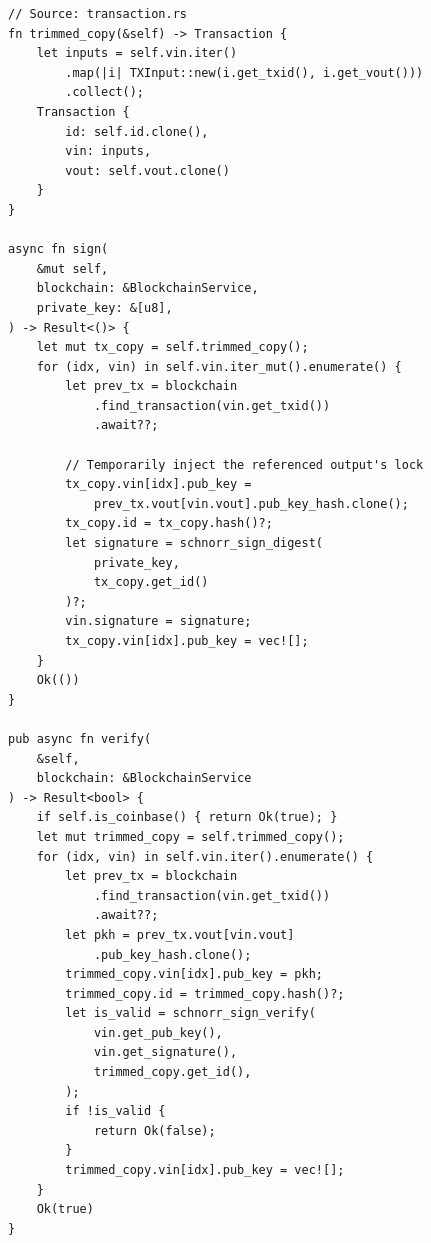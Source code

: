 \begin{listing}[htbp]
\caption{Trimmed copy, signing, and verification}
\label{lst:ch09-5-4}
\begin{verbatim}
// Source: transaction.rs
fn trimmed_copy(&self) -> Transaction {
    let inputs = self.vin.iter()
        .map(|i| TXInput::new(i.get_txid(), i.get_vout()))
        .collect();
    Transaction {
        id: self.id.clone(),
        vin: inputs,
        vout: self.vout.clone()
    }
}

async fn sign(
    &mut self,
    blockchain: &BlockchainService,
    private_key: &[u8],
) -> Result<()> {
    let mut tx_copy = self.trimmed_copy();
    for (idx, vin) in self.vin.iter_mut().enumerate() {
        let prev_tx = blockchain
            .find_transaction(vin.get_txid())
            .await??;

        // Temporarily inject the referenced output's lock
        tx_copy.vin[idx].pub_key =
            prev_tx.vout[vin.vout].pub_key_hash.clone();
        tx_copy.id = tx_copy.hash()?;
        let signature = schnorr_sign_digest(
            private_key,
            tx_copy.get_id()
        )?;
        vin.signature = signature;
        tx_copy.vin[idx].pub_key = vec![];
    }
    Ok(())
}

pub async fn verify(
    &self,
    blockchain: &BlockchainService
) -> Result<bool> {
    if self.is_coinbase() { return Ok(true); }
    let mut trimmed_copy = self.trimmed_copy();
    for (idx, vin) in self.vin.iter().enumerate() {
        let prev_tx = blockchain
            .find_transaction(vin.get_txid())
            .await??;
        let pkh = prev_tx.vout[vin.vout]
            .pub_key_hash.clone();
        trimmed_copy.vin[idx].pub_key = pkh;
        trimmed_copy.id = trimmed_copy.hash()?;
        let is_valid = schnorr_sign_verify(
            vin.get_pub_key(),
            vin.get_signature(),
            trimmed_copy.get_id(),
        );
        if !is_valid {
            return Ok(false);
        }
        trimmed_copy.vin[idx].pub_key = vec![];
    }
    Ok(true)
}
\end{verbatim}
\end{listing}

